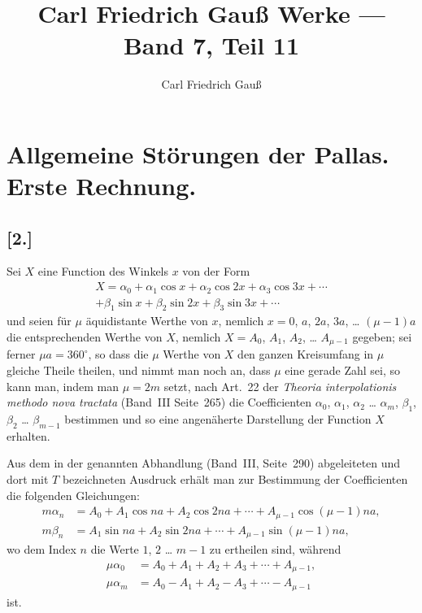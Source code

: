 \documentclass[12pt,a4paper]{article}
\title{Carl Friedrich Gauß Werke --- Band 7, Teil 11}
\author{Carl Friedrich Gauß}
\date{}
\begin{document}
\maketitle

\section*{Allgemeine Störungen der Pallas. Erste Rechnung.}

\subsection*{[2.]}

Sei $X$ eine Function des Winkels $x$ von der Form
\begin{multline*}
X = \alpha_0 + \alpha_1 \cos x + \alpha_2 \cos 2x + \alpha_3 \cos 3x + \cdots \\
+ \beta_1 \sin x + \beta_2 \sin 2x + \beta_3 \sin 3x + \cdots
\end{multline*}
und seien für $\mu$ äquidistante Werthe von $x$, nemlich $x = 0$, $a$, $2a$, $3a$, \ldots{} $(\mu-1)a$ die entsprechenden Werthe von $X$, nemlich $X = A_0$, $A_1$, $A_2$, \ldots{} $A_{\mu-1}$ gegeben; sei ferner $\mu a = 360^{\circ}$, so dass die $\mu$ Werthe von $X$ den ganzen Kreisumfang in $\mu$ gleiche Theile theilen, und nimmt man noch an, dass $\mu$ eine gerade Zahl sei, so kann man, indem man $\mu = 2m$ setzt, nach Art.~22 der \textit{Theoria interpolationis methodo nova tractata} (Band~III Seite~265) die Coefficienten $\alpha_0$, $\alpha_1$, $\alpha_2$ \ldots{} $\alpha_m$, $\beta_1$, $\beta_2$ \ldots{} $\beta_{m-1}$ bestimmen und so eine angenäherte Darstellung der Function $X$ erhalten.

Aus dem in der genannten Abhandlung (Band~III, Seite~290) abgeleiteten und dort mit $T$ bezeichneten Ausdruck erhält man zur Bestimmung der Coefficienten die folgenden Gleichungen:
\begin{align*}
m\alpha_n &= A_0 + A_1 \cos na + A_2 \cos 2na + \cdots + A_{\mu-1} \cos (\mu-1)na,\\
m\beta_n &= A_1 \sin na + A_2 \sin 2na + \cdots + A_{\mu-1} \sin (\mu-1)na,
\end{align*}
wo dem Index $n$ die Werte $1$, $2$ \ldots{} $m-1$ zu ertheilen sind, während
\begin{align*}
\mu\alpha_0 &= A_0 + A_1 + A_2 + A_3 + \cdots + A_{\mu-1},\\
\mu\alpha_m &= A_0 - A_1 + A_2 - A_3 + \cdots - A_{\mu-1}
\end{align*}
ist.
\end{document}
